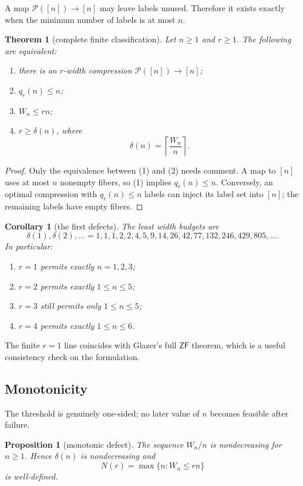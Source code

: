 \documentclass[11pt,letterpaper]{article}
\numberwithin{equation}{section}
\theoremstyle{plain}
\newtheorem{theorem}{Theorem}[section]
\newtheorem{proposition}[proposition]{Proposition}
\newtheorem{corollary}[corollary]{Corollary}
\theoremstyle{definition}
\theoremstyle{remark}
\newcommand{\Pow}{\mathcal P}
\newcommand{\ZF}{\mathsf{ZF}}
\begin{document}
A map $\Pow([n])\to[n]$ may leave labels unused.  Therefore it exists exactly
when the minimum number of labels is at most $n$.

\begin{theorem}[complete finite classification]\label{bwc:thm:finiteclass}
Let $n\geq1$ and $r\geq1$.  The following are equivalent:
\begin{enumerate}
\item there is an $r$-width compression $\Pow([n])\to[n]$;
\item $q_r(n)\leq n$;
\item $W_n\leq rn$;
\item $r\geq\delta(n)$, where
\[
 \delta(n)=\left\lceil\frac{W_n}{n}\right\rceil.
\]
\end{enumerate}
\end{theorem}

\begin{proof}
Only the equivalence between (1) and (2) needs comment.  A map to $[n]$ uses
at most $n$ nonempty fibers, so (1) implies $q_r(n)\leq n$.  Conversely, an
optimal compression with $q_r(n)\leq n$ labels can inject its label set into
$[n]$; the remaining labels have empty fibers.
\end{proof}

\begin{corollary}[the first defects]\label{bwc:cor:firstdefects}
The least width budgets are
\[
\delta(1),\delta(2),\dots=
1,1,1,2,2,4,5,9,14,26,42,77,132,246,429,805,\dots.
\]
In particular:
\begin{enumerate}
\item $r=1$ permits exactly $n=1,2,3$;
\item $r=2$ permits exactly $1\leq n\leq5$;
\item $r=3$ still permits only $1\leq n\leq5$;
\item $r=4$ permits exactly $1\leq n\leq6$.
\end{enumerate}
\end{corollary}

The finite $r=1$ line coincides with Glazer's full $\ZF$ theorem, which is a
useful consistency check on the formulation.

\subsection{Monotonicity}
The threshold is genuinely one-sided; no later value of $n$ becomes feasible
after failure.

\begin{proposition}[monotonic defect]\label{bwc:prop:monotonic}
The sequence $W_n/n$ is nondecreasing for $n\geq1$.  Hence $\delta(n)$ is
nondecreasing and
\[
 N(r)=\max\{n:W_n\leq rn\}
\]
is well-defined.
\end{proposition}
\end{document}

